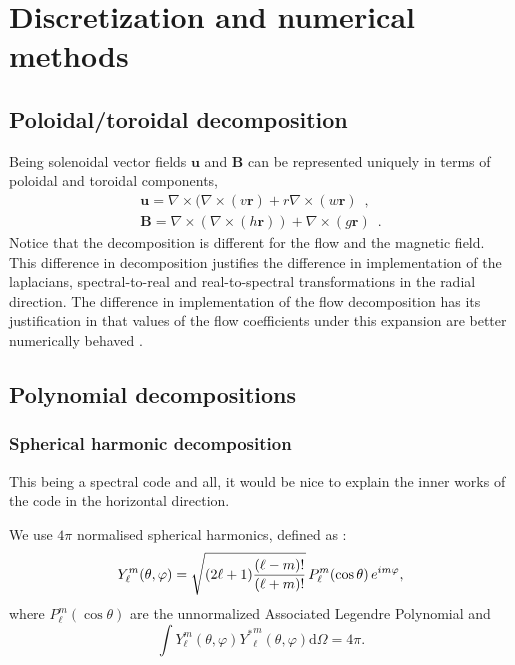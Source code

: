 \documentclass[a4paper,10pt]{book}
\renewcommand{\vec}[1]{\mathbf{#1}}
\begin{document}
\chapter{Discretization and numerical methods}

\section{Poloidal/toroidal decomposition}
Being solenoidal vector fields  $\vec u$ and $\vec B$ can be represented
uniquely in terms of poloidal and toroidal components,
\begin{subequations}
\begin{gather}
\vec u = \nabla \times ( \nabla \times (v \vec r) +
         r \nabla \times ( w \vec r) \enspace , \\
\vec B = \nabla \times ( \nabla \times (h \vec r) ) +
         \nabla \times ( g \vec r) \enspace .
\end{gather}
\end{subequations}
Notice that the decomposition is different for the flow and the magnetic field.
This difference in decomposition justifies the difference in implementation of
the laplacians, spectral-to-real and real-to-spectral transformations in the
radial direction. The difference in implementation of the flow decomposition has
its justification in that values of the flow coefficients under this expansion
are better numerically behaved \citep{Tilgner1999}.

\section{Polynomial decompositions}
\subsection{Spherical harmonic decomposition}
\label{s:SphericalHarmonicDecomp}
This being a spectral code and all, it would be nice to explain the inner works
of the code in the horizontal direction.

We use $4\pi$ normalised spherical harmonics, defined as :
\begin{equation}
 Y_\ell^m( \theta , \varphi ) =  \sqrt{{(2\ell+1) }{(\ell-m)!\over (\ell+m)!}} \, P_\ell^m ( \cos{\theta} )\, e^{i m \varphi },
\end{equation}
where $P_\ell^m ( \cos{\theta} )$ are the unnormalized Associated Legendre Polynomial
and
\begin{equation}
 \int Y_\ell^m( \theta , \varphi ) {Y^*}_\ell^m( \theta , \varphi ) \mbox{d}\Omega = 4\pi.
\end{equation}
\end{document}
